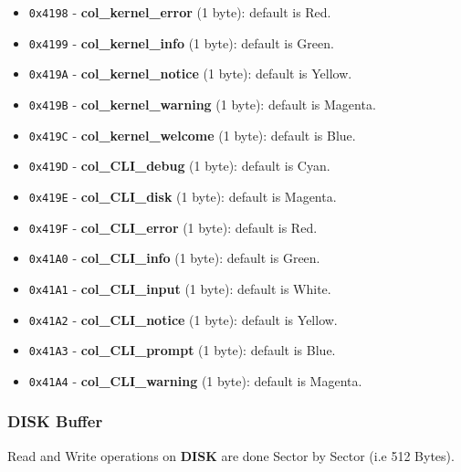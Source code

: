 \begin{itemize}
\begin{itemize}
                \item \texttt{0x4198} - \textbf{col\_kernel\_error} (1 byte):
                    default is Red.
                \item \texttt{0x4199} - \textbf{col\_kernel\_info} (1 byte):
                    default is Green.
                \item \texttt{0x419A} - \textbf{col\_kernel\_notice} (1 byte):
                    default is Yellow.
                \item \texttt{0x419B} - \textbf{col\_kernel\_warning} (1 byte):
                    default is Magenta.
                \item \texttt{0x419C} - \textbf{col\_kernel\_welcome} (1 byte):
                    default is Blue.
                \item \texttt{0x419D} - \textbf{col\_CLI\_debug} (1 byte):
                    default is Cyan.
                \item \texttt{0x419E} - \textbf{col\_CLI\_disk} (1 byte):
                    default is Magenta.
                \item \texttt{0x419F} - \textbf{col\_CLI\_error} (1 byte):
                    default is Red.
                \item \texttt{0x41A0} - \textbf{col\_CLI\_info} (1 byte):
                    default is Green.
                \item \texttt{0x41A1} - \textbf{col\_CLI\_input} (1 byte):
                    default is White.
                \item \texttt{0x41A2} - \textbf{col\_CLI\_notice} (1 byte):
                    default is Yellow.
                \item \texttt{0x41A3} - \textbf{col\_CLI\_prompt} (1 byte):
                    default is Blue.
                \item \texttt{0x41A4} - \textbf{col\_CLI\_warning} (1 byte):
                    default is Magenta.
            \end{itemize}
        \end{itemize}

        \subsubsection{DISK Buffer}

        Read and Write operations on \textbf{DISK} are done Sector by Sector (i.e 
        512 Bytes).

